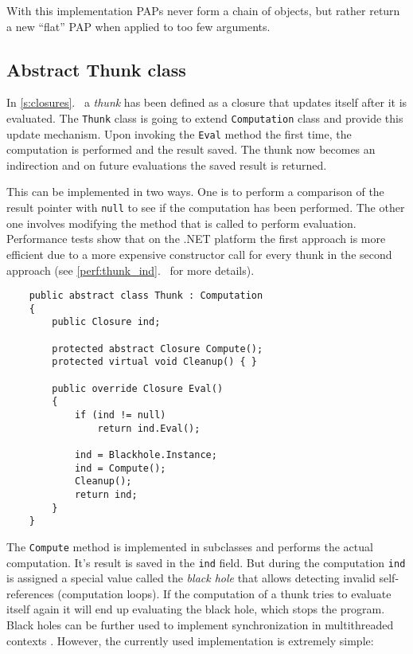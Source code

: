\documentclass[en]{pracamgr}
\newcommand{\myref}[1]{\ref{#1}.~\textit{\nameref{#1}}}
\begin{document}
With this implementation PAPs never form a chain of objects, but rather return a new ``flat'' PAP when applied to too few arguments.

\subsection{Abstract Thunk class}\label{s:thunk_class}

In \myref{s:closures} a \textit{thunk} has been defined as a
closure that updates itself after it is evaluated.
The \texttt{Thunk} class is going to extend
\texttt{Computation} class and provide this update
mechanism. Upon invoking the \texttt{Eval} method the first
time, the computation is performed and the result saved.
The thunk now becomes an indirection and on future evaluations
the saved result is returned.

This can be implemented in two ways. One is to perform a comparison
of the result pointer with \texttt{null} to see if
the computation has been performed.
The other one involves modifying the method that is called
to perform evaluation.
Performance tests show that on the .NET platform the first approach is more efficient
due to a more expensive constructor call for every thunk
in the second approach
(see \myref{perf:thunk_ind} for more details).

\begin{verbatim}
    public abstract class Thunk : Computation
    {
        public Closure ind;

        protected abstract Closure Compute();
        protected virtual void Cleanup() { }
        
        public override Closure Eval()
        {
            if (ind != null) 
                return ind.Eval();

            ind = Blackhole.Instance;
            ind = Compute();
            Cleanup();
            return ind;
        }
    }
\end{verbatim}

The \texttt{Compute} method is implemented in subclasses
and performs the actual computation.
It's result is saved in the \texttt{ind} field.
But during the computation \texttt{ind} is assigned a special
value called the \textit{black hole} that allows detecting
invalid self-references (computation loops).
If the computation of a thunk tries to evaluate itself
again it will end up evaluating the black hole, which stops
the program. Black holes can
be further used to implement synchronization in
multithreaded contexts \cite{multiprocessor}.
However, the currently used implementation is extremely simple:
\end{document}
